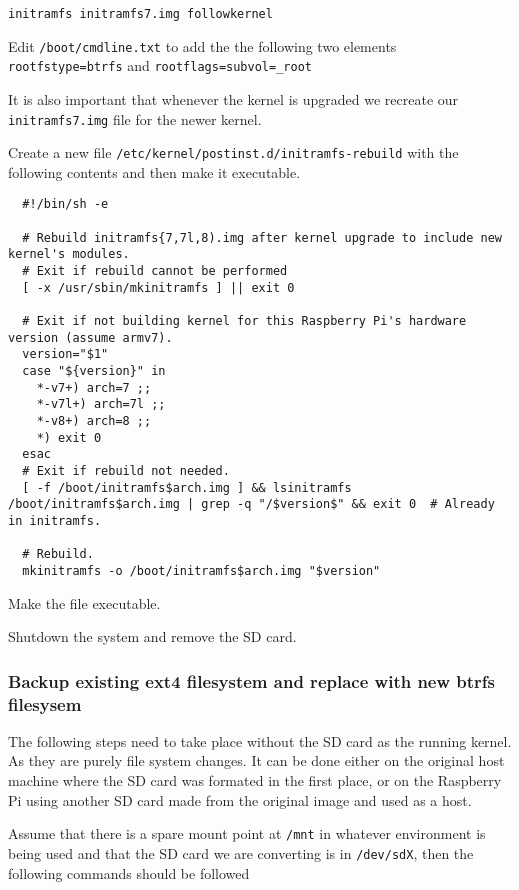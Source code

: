 \documentclass[Draft]{akc}
\begin{document}
\begin{lstlisting}
initramfs initramfs7.img followkernel
\end{lstlisting}

Edit \texttt{/boot/cmdline.txt} to add the the following two elements \texttt{rootfstype=btrfs} and
\texttt{rootflags=subvol=\_root}

It is also important that whenever the kernel is upgraded we recreate our \texttt{initramfs7.img}
file for the newer kernel.

Create a new file \texttt{/etc/kernel/postinst.d/initramfs-rebuild} with the following contents and
then make it executable.

\begin{lstlisting}
  #!/bin/sh -e

  # Rebuild initramfs{7,7l,8).img after kernel upgrade to include new kernel's modules.
  # Exit if rebuild cannot be performed
  [ -x /usr/sbin/mkinitramfs ] || exit 0

  # Exit if not building kernel for this Raspberry Pi's hardware version (assume armv7).
  version="$1"
  case "${version}" in
    *-v7+) arch=7 ;;
    *-v7l+) arch=7l ;;
    *-v8+) arch=8 ;;
    *) exit 0
  esac
  # Exit if rebuild not needed.
  [ -f /boot/initramfs$arch.img ] && lsinitramfs /boot/initramfs$arch.img | grep -q "/$version$" && exit 0  # Already in initramfs.

  # Rebuild.
  mkinitramfs -o /boot/initramfs$arch.img "$version"
\end{lstlisting}

Make the file executable.

Shutdown the system and remove the SD card.
\subsubsection{Backup existing ext4 filesystem and replace with new btrfs filesysem}

The following steps need to take place without the SD card as the running kernel. As they are purely
file system changes.  It can be done either on the original host machine where the SD card was
formated in the first place, or on the Raspberry Pi using another SD card made from the original
image and used as a host.

Assume that there is a spare mount point at \texttt{/mnt} in whatever environment is being used and that the
SD card we are converting is in \texttt{/dev/sdX}, then the
following commands should be followed
\end{document}
